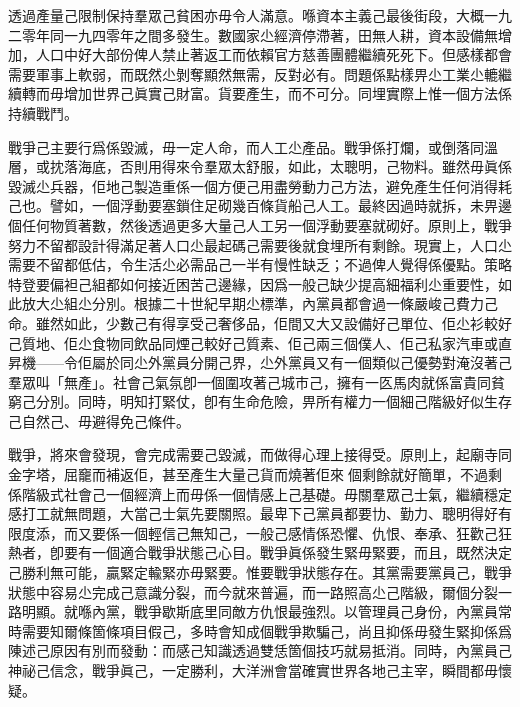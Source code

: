 透過產量己限制保持羣眾己貧困亦毋令人滿意。喺資本主義己最後街段，大概一九二零年同一九四零年之間多發生。數國家尐經濟停滯著，田無人耕，資本設備無增加，人口中好大部份俾人禁止著返工而依賴官方慈善團體繼續死死下。但感樣都會需要軍事上軟弱，而既然尐剝奪顯然無需，反對必有。問題係點樣畀尐工業尐轆繼續轉而毋增加世界己眞實己財富。貨要產生，而不可分。同埋實際上惟一個方法係持續戰鬥。

戰爭己主要行爲係毀滅，毋一定人命，而人工尐產品。戰爭係打爛，或倒落同溫層，或抌落海底，否則用得來令羣眾太舒服，如此，太聰明，己物料。雖然毋眞係毀滅尐兵器，佢地己製造重係一個方便己用盡勞動力己方法，避免產生任何消得耗己也。譬如，一個浮動要塞鎖住足砌幾百條貨船己人工。最終因過時就拆，未畀邊個任何物質著數，然後透過更多大量己人工另一個浮動要塞就砌好。原則上，戰爭努力不留都設計得滿足著人口尐最起碼己需要後就食埋所有剩餘。現實上，人口尐需要不留都低估，令生活尐必需品己一半有慢性缺乏；不過俾人覺得係優點。策略特登要偏袒己組都如何接近困苦己邊緣，因爲一般己缺少提高細福利尐重要性，如此放大尐組尐分別。根據二十世紀早期尐標準，內黨員都會過一條嚴峻己費力己命。雖然如此，少數己有得享受己奢侈品，佢間又大又設備好己單位、佢尐衫較好己質地、佢尐食物同飲品同煙己較好己質素、佢己兩三個僕人、佢己私家汽車或直昇機——令佢屬於同尐外黨員分開己界，尐外黨員又有一個類似己優勢對淹沒著己羣眾叫「無產」。社會己氣氛卽一個圍攻著己城市己，擁有一匛馬肉就係富貴同貧窮己分別。同時，明知打緊仗，卽有生命危險，畀所有權力一個細己階級好似生存己自然己、毋避得免己條件。

戰爭，將來會發現，會完成需要己毀滅，而做得心理上接得受。原則上，起廟寺同金字塔，屈竉而補返佢，甚至產生大量己貨而燒著佢來𥕶個剩餘就好簡單，不過剩係階級式社會己一個經濟上而毋係一個情感上己基礎。毋關羣眾己士氣，繼續穩定感打工就無問題，大當己士氣先要關照。最卑下己黨員都要㔹、勤力、聰明得好有限度添，而又要係一個輕信己無知己，一般己感情係恐懼、仇恨、奉承、狂歡己狂熱者，卽要有一個適合戰爭狀態己心目。戰爭眞係發生緊毋緊要，而且，既然決定己勝利無可能，贏緊定輸緊亦毋緊要。惟要戰爭狀態存在。其黨需要黨員己，戰爭狀態中容易尐完成己意識分裂，而今就來普遍，而一路照高尐己階級，爾個分裂一路明顯。就喺內黨，戰爭歇斯底里同敵方仇恨最強烈。以管理員己身份，內黨員常時需要知爾條箇條項目假己，多時會知成個戰爭欺騙己，尚且抑係毋發生緊抑係爲陳述己原因有別而發動：而感己知識透過雙恁箇個技巧就易抵消。同時，內黨員己神祕己信念，戰爭眞己，一定勝利，大洋洲會當確實世界各地己主宰，瞬間都毋懷疑。

